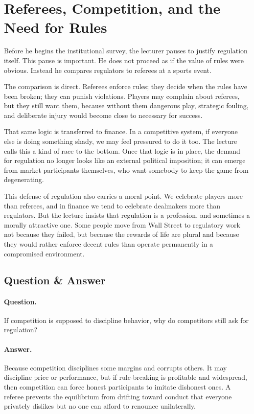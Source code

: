\section{Referees, Competition, and the Need for Rules}

Before he begins the institutional survey, the lecturer pauses to justify regulation itself. This pause is important. He does not proceed as if the value of rules were obvious. Instead he compares regulators to referees at a sports event.

The comparison is direct. Referees enforce rules; they decide when the rules have been broken; they can punish violations. Players may complain about referees, but they still want them, because without them dangerous play, strategic fouling, and deliberate injury would become close to necessary for success.

That same logic is transferred to finance. In a competitive system, if everyone else is doing something shady, we may feel pressured to do it too. The lecture calls this a kind of race to the bottom. Once that logic is in place, the demand for regulation no longer looks like an external political imposition; it can emerge from market participants themselves, who want somebody to keep the game from degenerating.

This defense of regulation also carries a moral point. We celebrate players more than referees, and in finance we tend to celebrate dealmakers more than regulators. But the lecture insists that regulation is a profession, and sometimes a morally attractive one. Some people move from Wall Street to regulatory work not because they failed, but because the rewards of life are plural and because they would rather enforce decent rules than operate permanently in a compromised environment.

\subsection{Question \& Answer}

\paragraph{Question.} If competition is supposed to discipline behavior, why do competitors still ask for regulation?

\paragraph{Answer.} Because competition disciplines some margins and corrupts others. It may discipline price or performance, but if rule-breaking is profitable and widespread, then competition can force honest participants to imitate dishonest ones. A referee prevents the equilibrium from drifting toward conduct that everyone privately dislikes but no one can afford to renounce unilaterally.

